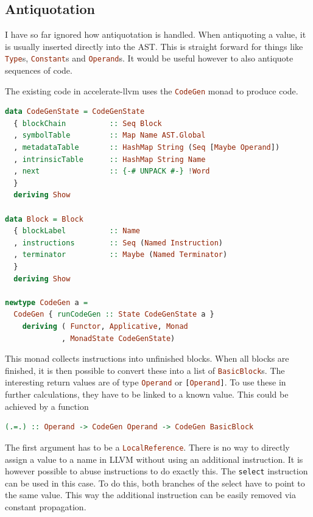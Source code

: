 \documentclass[a4paper,bibliography=totocnumbered,parskip,headsepline]{scrbook}
\begin{document}
\subsection{Antiquotation}
I have so far ignored how antiquotation is handled.
When antiquoting a value, it is usually inserted directly into the AST.
This is straight forward for things like \lstinline[language=haskell]!Type!s, \lstinline[language=haskell]!Constant!s and \lstinline[language=haskell]!Operand!s.
It would be useful however to also antiquote sequences of code.

The existing code in accelerate-llvm uses the \lstinline[language=haskell]!CodeGen! monad to produce code.
\begin{lstlisting}[language=haskell]
data CodeGenState = CodeGenState
  { blockChain          :: Seq Block
  , symbolTable         :: Map Name AST.Global
  , metadataTable       :: HashMap String (Seq [Maybe Operand])
  , intrinsicTable      :: HashMap String Name
  , next                :: {-# UNPACK #-} !Word
  }
  deriving Show

data Block = Block
  { blockLabel          :: Name
  , instructions        :: Seq (Named Instruction)
  , terminator          :: Maybe (Named Terminator)
  }
  deriving Show

newtype CodeGen a =
  CodeGen { runCodeGen :: State CodeGenState a }
    deriving ( Functor, Applicative, Monad
             , MonadState CodeGenState)
\end{lstlisting}

This monad collects instructions into unfinished blocks.
When all blocks are finished, it is then possible to convert these into a list of \lstinline[language=haskell]!BasicBlock!s.
The interesting return values are of type \lstinline[language=haskell]!Operand! or \lstinline[language=haskell]![Operand]!.
To use these in further calculations, they have to be linked to a known value.
This could be achieved by a function
\begin{lstlisting}[language=haskell]
(.=.) :: Operand -> CodeGen Operand -> CodeGen BasicBlock
\end{lstlisting}
The first argument has to be a \lstinline[language=haskell]!LocalReference!.
There is no way to directly assign a value to a name in LLVM without using an additional instruction.
It is however possible to abuse instructions to do exactly this.
The \lstinline!select! instruction can be used in this case.
To do this, both branches of the select have to point to the same value.
This way the additional instruction can be easily removed via constant propagation.
\end{document}
